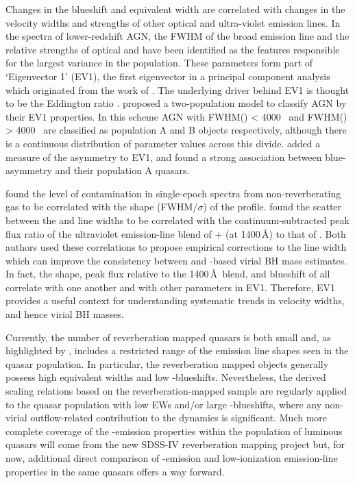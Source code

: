 Changes in the  blueshift and equivalent width are correlated with changes in the velocity widths and strengths of other optical and ultra-violet emission lines.
In the spectra of lower-redshift AGN, the FWHM of the broad \hb emission line and the relative strengths of optical  and \hb have been identified as the features responsible for the largest variance in the population. 
These parameters form part of `Eigenvector 1' (EV1), the first eigenvector in a principal component analysis which originated from the work of \citet{boroson92}.   
The underlying driver behind EV1 is thought to be the Eddington ratio \citep[e.g.][]{sulentic00b,shen14}. 
\citet{sulentic00} proposed a two-population model to classify AGN by their EV1 properties. 
In this scheme AGN with FWHM(\hbns) < 4000 \kms\, and FWHM(\hbns) > 4000 \kms\, are classified as population A and B objects respectively, although there is a continuous distribution of parameter values across this divide. 
\citet{sulentic07} added a measure of the  asymmetry to EV1, and found a strong association between blue-asymmetry and their population A quasars.

\citet{denney12} found the level of contamination in single-epoch spectra from non-reverberating gas to be correlated with the shape (FWHM/$\sigma$) of the  profile. 
\citet{runnoe13} found the scatter between the  and \hb line widths to be correlated with the continuum-subtracted peak flux ratio of the ultraviolet emission-line blend of + (at 1400\,\AA) to that of . 
Both authors used these correlations to propose empirical corrections to the  line width which can improve the consistency between  and \hbns-based virial BH mass estimates. 
In fact, the shape, peak flux relative to the 1400\,\AA\, blend, and blueshift of  all correlate with one another and with other parameters in EV1.
Therefore, EV1 provides a useful context for understanding systematic trends in  velocity widths, and hence virial BH masses. 

Currently, the number of reverberation mapped quasars is both small \citep[$\sim$50 quasars;][]{park13} and, as highlighted by \citet{richards11}, includes a restricted range of the  emission line shapes seen in the quasar population. 
In particular, the reverberation mapped objects generally possess high  equivalent widths and low -blueshifts. 
Nevertheless, the derived scaling relations based on the reverberation-mapped sample are regularly applied to the quasar population with low  EWs and/or large -blueshifts, where any non-virial outflow-related contribution to the dynamics is significant. 
Much more complete coverage of the -emission properties within the population of luminous quasars will come from the new SDSS-IV reverberation mapping project \citep{shen15} but, for now, additional direct comparison of -emission and low-ionization emission-line properties in the same quasars offers a way forward.

